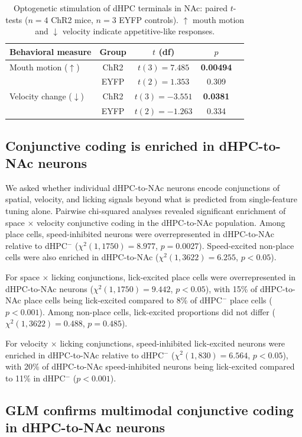 \documentclass[11pt]{article}
\begin{document}
\begin{table}[H]
\centering
\caption{Optogenetic stimulation of dHPC terminals in NAc: paired $t$-tests ($n=4$ ChR2 mice, $n=3$ EYFP controls). $\uparrow$ mouth motion and $\downarrow$ velocity indicate appetitive-like responses.}
\label{tab:opto}
\begin{tabular}{lcccc}
\toprule
Behavioral measure & Group & $t$ (df) & $p$ \\
\midrule
Mouth motion ($\uparrow$) & ChR2 & $t(3)=\mathbf{7.485}$ & \textbf{0.00494} \\
 & EYFP & $t(2)=1.353$ & 0.309 \\
Velocity change ($\downarrow$) & ChR2 & $t(3)=\mathbf{-3.551}$ & \textbf{0.0381} \\
 & EYFP & $t(2)=-1.263$ & 0.334 \\
\bottomrule
\end{tabular}
\end{table}

\subsection{Conjunctive coding is enriched in dHPC-to-NAc neurons}

We asked whether individual dHPC-to-NAc neurons encode conjunctions of spatial, velocity, and licking signals beyond what is predicted from single-feature tuning alone. Pairwise chi-squared analyses revealed significant enrichment of space $\times$ velocity conjunctive coding in the dHPC-to-NAc population. Among place cells, speed-inhibited neurons were overrepresented in dHPC-to-NAc relative to dHPC$^{-}$ ($\chi^{2}(1, 1750)=8.977$, $p=0.0027$). Speed-excited non-place cells were also enriched in dHPC-to-NAc ($\chi^{2}(1, 3622)=6.255$, $p<0.05$).

For space $\times$ licking conjunctions, lick-excited place cells were overrepresented in dHPC-to-NAc neurons ($\chi^{2}(1, 1750)=9.442$, $p<0.05$), with 15\% of dHPC-to-NAc place cells being lick-excited compared to 8\% of dHPC$^{-}$ place cells ($p<0.001$). Among non-place cells, lick-excited proportions did not differ ($\chi^{2}(1, 3622)=0.488$, $p=0.485$).

For velocity $\times$ licking conjunctions, speed-inhibited lick-excited neurons were enriched in dHPC-to-NAc relative to dHPC$^{-}$ ($\chi^{2}(1, 830)=6.564$, $p<0.05$), with 20\% of dHPC-to-NAc speed-inhibited neurons being lick-excited compared to 11\% in dHPC$^{-}$ ($p<0.001$).

\subsection{GLM confirms multimodal conjunctive coding in dHPC-to-NAc neurons}
\end{document}
